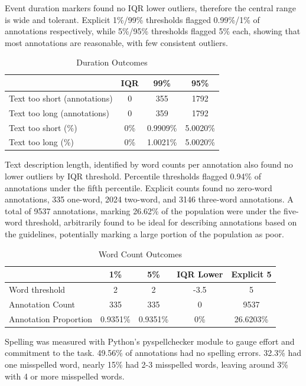 \documentclass{article}
\begin{document}
Event duration markers found no IQR lower outliers, therefore the central range is wide and tolerant. Explicit 1\%/99\% thresholds flagged 0.99\%/1\% of annotations respectively, while 5\%/95\% thresholds flagged 5\% each, showing that most annotations are reasonable, with few consistent outliers.

\begin{table}[H]
  \caption{Duration Outcomes}
  \label{tab:duration_outcomes}
  \centering
  \begin{tabular}{lccc}
    \toprule
    & IQR & 99\% & 95\% \\
    \midrule
    Text too short (annotations) & 0 & 355 & 1792 \\
    Text too long (annotations) & 0 & 359 & 1792 \\
    Text too short (\%) & 0\% & 0.9909\% & 5.0020\% \\
    Text too long (\%) & 0\% & 1.0021\% & 5.0020\% \\
    \bottomrule
  \end{tabular}
\end{table}

Text description length, identified by word counts per annotation also found no lower outliers by IQR threshold. Percentile thresholds flagged 0.94\% of annotations under the fifth percentile. Explicit counts found no zero-word annotations, 335 one-word, 2024 two-word, and 3146 three-word annotations. A total of 9537 annotations, marking 26.62\% of the population were under the five-word threshold, arbitrarily found to be ideal for describing annotations based on the guidelines, potentially marking a large portion of the population as poor.

\begin{table}[H]
  \caption{Word Count Outcomes}
  \label{tab:word_outcomes}
  \centering
  \begin{tabular}{lcccc}
    \toprule
    & 1\% & 5\% & IQR Lower & Explicit 5 \\
    \midrule
    Word threshold & 2 & 2 & -3.5 & 5 \\
    Annotation Count & 335 & 335 & 0 & 9537 \\
    Annotation Proportion & 0.9351\% & 0.9351\% & 0\% & 26.6203\% \\
    \bottomrule
  \end{tabular}
\end{table}

Spelling was measured with Python's pyspellchecker module to gauge effort and commitment to the task. 49.56\% of annotations had no spelling errors. 32.3\% had one misspelled word, nearly 15\% had 2-3 misspelled words, leaving around 3\% with 4 or more misspelled words.
\end{document}
